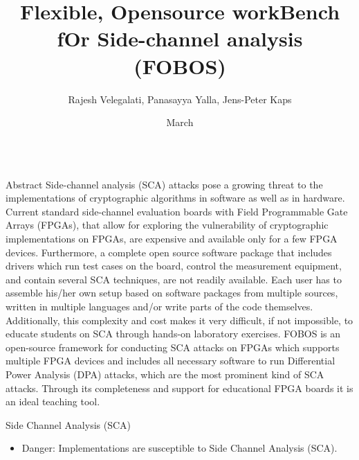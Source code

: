 \documentclass[xcolor=pdftex,dvipsnames,table,final]{beamer}
\title{\LARGE Flexible, Opensource workBench fOr Side-channel analysis\\ \vspace{0.5ex}(FOBOS)}
\author{Rajesh Velegalati, Panasayya Yalla, Jens-Peter Kaps}%
\institute{\vspace{-1ex}Department of Electrical and Computer Engineering, George Mason University, Fairfax, Virginia 22030, USA
          } %
\date{March}
\begin{document}
\begin{frame}[fragile]{} 
  \begin{columns}[t]
    \begin{column}{.31\linewidth}

      \begin{block}{Abstract}
Side-channel analysis (SCA) attacks pose a growing threat to the
implementations of cryptographic algorithms in software as well as in
hardware. Current standard side-channel evaluation boards with Field
Programmable Gate Arrays (FPGAs), that allow for exploring the
vulnerability of cryptographic implementations on FPGAs, are expensive
and available only for a few FPGA devices. Furthermore, a complete
open source software package that includes drivers which run test cases
on the board, control the measurement equipment, and contain several
SCA techniques, are not readily available. Each user has to assemble
his/her own setup based on software packages from multiple sources,
written in multiple languages and/or write parts of the code
themselves. Additionally, this complexity and cost makes it very
difficult, if not impossible, to educate students on SCA through
hands-on laboratory exercises. 
FOBOS is an open-source framework for
conducting SCA attacks on FPGAs which supports multiple FPGA devices
and includes all necessary software to run Differential Power Analysis
(DPA) attacks, which are the most prominent kind of SCA attacks.
Through its completeness and support for educational FPGA boards it is
an ideal teaching tool.


      \end{block}
	 

      \begin{block}{Side Channel Analysis (SCA)}
        \begin{itemize}
          \item {\color{red}Danger:} Implementations are susceptible to Side Channel Analysis (SCA).
        \end{itemize}


\end{block}
\end{column}
\end{columns}
\end{frame}
\end{document}
